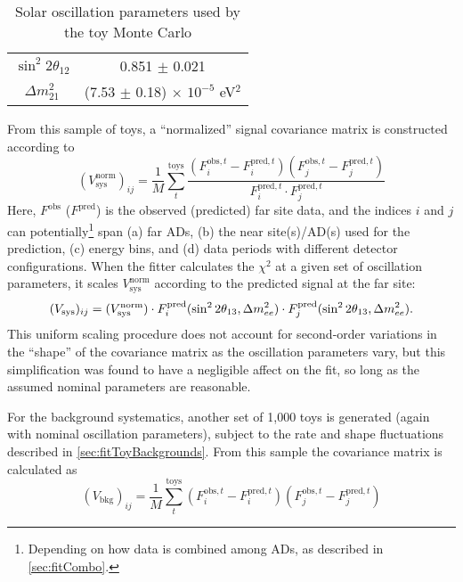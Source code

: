 \documentclass[../thesis.tex]{subfiles}
\begin{document}
\begin{table}[h]
  \centering
  \begin{tabular}{cc}
    \toprule
    $\sin^2 2\theta_{12}$ & 0.851 $\pm$ 0.021 \\
    $\Delta m^2_{21}$ & (7.53 $\pm$ 0.18) $\times$ $10^{-5}$ eV$^2$ \\
    \bottomrule
  \end{tabular}
  \caption{Solar oscillation parameters used by the toy Monte Carlo}
  \label{tab:fitSolarPars}
\end{table}

From this sample of toys, a ``normalized'' signal covariance matrix is constructed according to
\begin{equation*}
  (V^{\mathrm{norm}}_{\mathrm{sys}})_{ij} = \frac{1}{M} \sum_t^{\mathrm{toys}}
  \frac{(F^{\mathrm{obs},t}_i - F^{\mathrm{pred},t}_i)(F^{\mathrm{obs},t}_j - F^{\mathrm{pred},t}_j)}%
       {F^{\mathrm{pred},t}_i \cdot F^{\mathrm{pred},t}_j}
\end{equation*}
Here, $F^{\mathrm{obs}}$ ($F^{\mathrm{pred}}$) is the observed (predicted) far site data, and the indices $i$ and $j$ can potentially\footnote{Depending on how data is combined among ADs, as described in \autoref{sec:fitCombo}.} span (a) far ADs, (b) the near site(s)/AD(s) used for the prediction, (c) energy bins, and (d) data periods with different detector configurations. When the fitter calculates the $\chi^2$ at a given set of oscillation parameters, it scales $V^{\mathrm{norm}}_{\mathrm{sys}}$ according to the predicted signal at the far site:
\begin{equation*}
  (V_{\mathrm{sys}})_{ij} = (V^{\mathrm{norm}}_{\mathrm{sys}}) \cdot F^{\mathrm{pred}}_i(\sin^2 2\theta_{13}, \Delta m^2_{ee})
  \cdot F^{\mathrm{pred}}_j(\sin^2 2\theta_{13}, \Delta m^2_{ee}).
\end{equation*}
This uniform scaling procedure does not account for second-order variations in the ``shape'' of the covariance matrix as the oscillation parameters vary, but this simplification was found to have a negligible affect on the fit, so long as the assumed nominal parameters are reasonable.

For the background systematics, another set of 1,000 toys is generated (again with nominal oscillation parameters), subject to the rate and shape fluctuations described in \autoref{sec:fitToyBackgrounds}. From this sample the covariance matrix is calculated as
\begin{equation*}
  (V_{\mathrm{bkg}})_{ij} = \frac{1}{M} \sum_t^{\mathrm{toys}}
  (F^{\mathrm{obs},t}_i - F^{\mathrm{pred},t}_i)(F^{\mathrm{obs},t}_j - F^{\mathrm{pred},t}_j)
\end{equation*}
\end{document}
